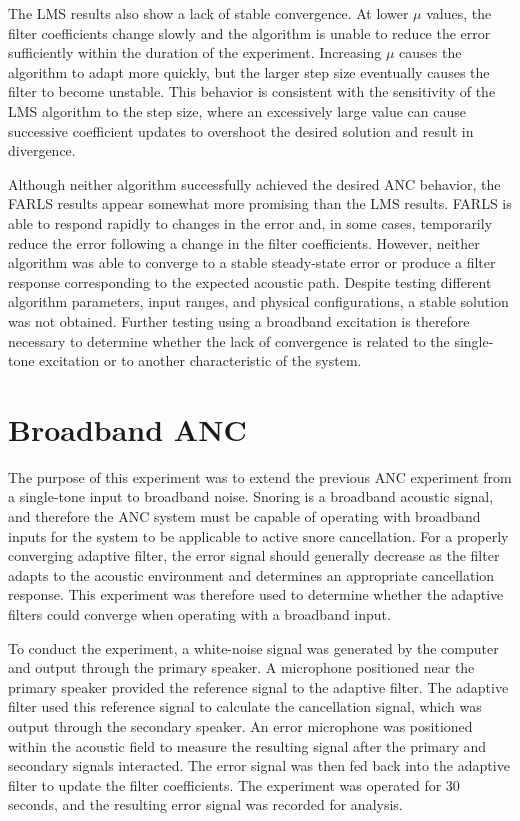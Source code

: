 The LMS results also show a lack of stable convergence. At lower $\mu$ values, the filter coefficients change slowly and the algorithm is unable to reduce the error sufficiently within the duration of the experiment. Increasing $\mu$ causes the algorithm to adapt more quickly, but the larger step size eventually causes the filter to become unstable. This behavior is consistent with the sensitivity of the LMS algorithm to the step size, where an excessively large value can cause successive coefficient updates to overshoot the desired solution and result in divergence.

Although neither algorithm successfully achieved the desired ANC behavior, the FARLS results appear somewhat more promising than the LMS results. FARLS is able to respond rapidly to changes in the error and, in some cases, temporarily reduce the error following a change in the filter coefficients. However, neither algorithm was able to converge to a stable steady-state error or produce a filter response corresponding to the expected acoustic path. Despite testing different algorithm parameters, input ranges, and physical configurations, a stable solution was not obtained. Further testing using a broadband excitation is therefore necessary to determine whether the lack of convergence is related to the single-tone excitation or to another characteristic of the system.


\section{Broadband ANC}

The purpose of this experiment was to extend the previous ANC experiment from a single-tone input to broadband noise. Snoring is a broadband acoustic signal, and therefore the ANC system must be capable of operating with broadband inputs for the system to be applicable to active snore cancellation. For a properly converging adaptive filter, the error signal should generally decrease as the filter adapts to the acoustic environment and determines an appropriate cancellation response. This experiment was therefore used to determine whether the adaptive filters could converge when operating with a broadband input.

To conduct the experiment, a white-noise signal was generated by the computer and output through the primary speaker. A microphone positioned near the primary speaker provided the reference signal to the adaptive filter. The adaptive filter used this reference signal to calculate the cancellation signal, which was output through the secondary speaker. An error microphone was positioned within the acoustic field to measure the resulting signal after the primary and secondary signals interacted. The error signal was then fed back into the adaptive filter to update the filter coefficients. The experiment was operated for 30 seconds, and the resulting error signal was recorded for analysis.

